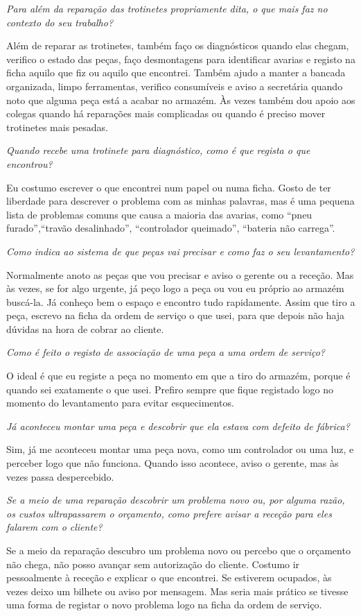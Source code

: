 \documentclass[11pt,a4paper]{article}
\newcommand{\pergunta}[1]{\item[P:] \textit{#1}}
\newcommand{\resposta}[1]{\item[R:] #1}
\begin{document}
	\begin{transcription}
		
	\pergunta{Para além da reparação das trotinetes propriamente dita, o que mais faz no contexto do seu trabalho?}
	\resposta{Além de reparar as trotinetes, também faço os diagnósticos quando elas chegam, verifico o estado das peças, faço desmontagens para identificar avarias e registo na ficha aquilo que fiz ou aquilo que encontrei. Também ajudo a manter a bancada organizada, limpo ferramentas, verifico consumíveis e aviso a secretária quando noto que alguma peça está a acabar no armazém. Às vezes também dou apoio aos colegas quando há reparações mais complicadas ou quando é preciso mover trotinetes mais pesadas.}

	\pergunta{Quando recebe uma trotinete para diagnóstico, como é que regista o que encontrou?}
	\resposta{Eu costumo escrever o que encontrei num papel ou numa ficha. Gosto de ter liberdade para descrever o problema com as minhas palavras, mas é uma pequena lista de problemas comuns que causa a maioria das avarias, como “pneu furado”,“travão desalinhado”, “controlador queimado”, “bateria não carrega”.}

	\pergunta{Como indica ao sistema de que peças vai precisar e como faz o seu levantamento?}
	\resposta{Normalmente anoto as peças que vou precisar e aviso o gerente ou a receção. Mas às vezes, se for algo urgente, já peço logo a peça ou vou eu próprio ao armazém buscá-la. Já conheço bem o espaço e encontro tudo rapidamente. Assim que tiro a peça, escrevo na ficha da ordem de serviço o que usei, para que depois não haja dúvidas na hora de cobrar ao cliente.}
    
	\pergunta{Como é feito o registo de associação de uma peça a uma ordem de serviço?}
	\resposta{O ideal é que eu registe a peça no momento em que a tiro do armazém, porque é quando sei exatamente o que usei. Prefiro sempre que fique registado logo no momento do levantamento para evitar esquecimentos.}

	\pergunta{Já aconteceu montar uma peça e descobrir que ela estava com defeito de fábrica?}
	\resposta{Sim, já me aconteceu montar uma peça nova, como um controlador ou uma luz, e perceber logo que não funciona. Quando isso acontece, aviso o gerente, mas às vezes passa despercebido.}

	\pergunta{Se a meio de uma reparação descobrir um problema novo ou, por alguma razão, os custos ultrapassarem o orçamento, como prefere avisar a receção para eles falarem com o cliente?}
	\resposta{Se a meio da reparação descubro um problema novo ou percebo que o orçamento não chega, não posso avançar sem autorização do cliente. Costumo ir pessoalmente à receção e explicar o que encontrei. Se estiverem ocupados, às vezes deixo um bilhete ou aviso por mensagem. Mas seria mais prático se tivesse uma forma de registar o novo problema logo na ficha da ordem de serviço.}


\end{transcription}
\end{document}
